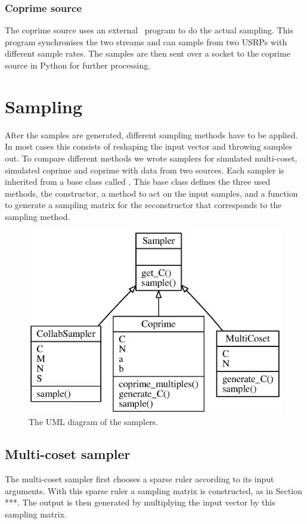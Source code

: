 \documentclass[a4paper, openany, oneside]{memoir}
\begin{document}
\subsubsection{Coprime source}
The coprime source uses an external \CC~program to do the actual sampling. This program synchronises the two streams and can sample from two USRPs with different sample rates. The samples are then sent over a socket to the coprime source in Python for further processing.


\section{Sampling}
\label{sec:sampling}
After the samples are generated, different sampling methods have to be applied. In most cases this consists of reshaping the input vector and throwing samples out. To compare different methods we wrote samplers for simulated multi-coset, simulated coprime and coprime with data from two sources. Each sampler is inherited from a base class called . This base class defines the three used methods, the constructor, a  method to act on the input samples, and a  function to generate a sampling matrix for the reconstructor that corresponds to the sampling method.

\begin{figure}
    \centering
    \includegraphics[width=\linewidth]{./figures/classes_sampling.eps}
    \caption{The UML diagram of the samplers.}
    \label{fig:}
\end{figure}

\subsection{Multi-coset sampler}
\label{sec:multi-coset-sampler}
The multi-coset sampler first chooses a sparse ruler according to its input arguments. With this sparse ruler a sampling matrix is constructed, as in Section ***. The output is then generated by multiplying the input vector by this sampling matrix.
\end{document}
